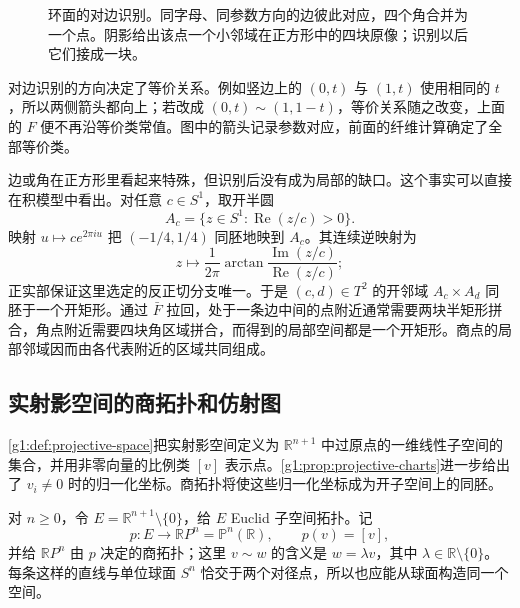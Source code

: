 \begin{figure}[htbp]
	\centering
	
	\caption[环面的对边识别]{环面的对边识别。同字母、同参数方向的边彼此对应，四个角合并为一个点。阴影给出该点一个小邻域在正方形中的四块原像；识别以后它们接成一块。}
	\label{g1:fig:torus-square}
\end{figure}

对边识别的方向决定了等价关系。例如竖边上的 \((0,t)\) 与 \((1,t)\) 使用相同的 \(t\)，所以两侧箭头都向上；若改成 \((0,t)\sim(1,1-t)\)，等价关系随之改变，上面的 \(F\) 便不再沿等价类常值。图中的箭头记录参数对应，前面的纤维计算确定了全部等价类。

边或角在正方形里看起来特殊，但识别后没有成为局部的缺口。这个事实可以直接在积模型中看出。对任意 \(c\in S^1\)，取开半圆
\[
	A_c=\{z\in S^1:\operatorname{Re}(z/c)>0\}.
\]
映射 \(u\mapsto ce^{2\pi iu}\) 把 \((-1/4,1/4)\) 同胚地映到 \(A_c\)。其连续逆映射为
\[
	z\longmapsto\frac1{2\pi}\arctan\frac{\operatorname{Im}(z/c)}{\operatorname{Re}(z/c)};
\]
正实部保证这里选定的反正切分支唯一。于是 \((c,d)\in T^2\) 的开邻域 \(A_c\times A_d\) 同胚于一个开矩形。通过 \(\bar F\) 拉回，处于一条边中间的点附近通常需要两块半矩形拼合，角点附近需要四块角区域拼合，而得到的局部空间都是一个开矩形。商点的局部邻域因而由各代表附近的区域共同组成。

\subsection{实射影空间的商拓扑和仿射图}
\label{g1:subsec:0405:02}

\cref{g1:def:projective-space}把实射影空间定义为 \(\mathbb R^{n+1}\) 中过原点的一维线性子空间的集合，并用非零向量的比例类 \([v]\) 表示点。\cref{g1:prop:projective-charts}进一步给出了 \(v_i\ne0\) 时的归一化坐标。商拓扑将使这些归一化坐标成为开子空间上的同胚。

对 \(n\ge0\)，令 \(E=\mathbb R^{n+1}\setminus\{0\}\)，给 \(E\) Euclid 子空间拓扑。记
\[
	p:E\longrightarrow\mathbb RP^n=\mathbb P^n(\mathbb R),\qquad p(v)=[v],
\]
并给 \(\mathbb RP^n\) 由 \(p\) 决定的商拓扑；这里 \(v\sim w\) 的含义是 \(w=\lambda v\)，其中 \(\lambda\in\mathbb R\setminus\{0\}\)。每条这样的直线与单位球面 \(S^n\) 恰交于两个对径点，所以也应能从球面构造同一个空间。

